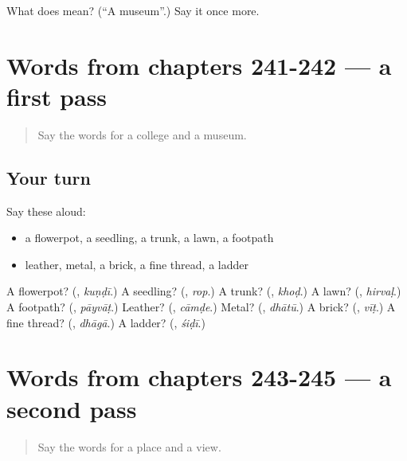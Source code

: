 \begin{tcolorbox}[breakable,colback=teal!4,colframe=teal!35!black,title={Before you move on}]
What does  mean? (\textquotedblleft{}A museum\textquotedblright{}.) Say it once more.
\end{tcolorbox}
\section[(dialogue)]{Words from chapters 241-242 — a first pass}

\label{lesson:MR-R245-first-pass-words-from-chapters-241-242}



\begin{quote}
Say the words for a college and a museum.
\end{quote}

\subsection*{Your turn}
Say these aloud:

\begin{itemize}
\raggedright
  \item a flowerpot, a seedling, a trunk, a lawn, a footpath
  \item leather, metal, a brick, a fine thread, a ladder
\end{itemize}

\begin{tcolorbox}[breakable,colback=teal!4,colframe=teal!35!black,title={Before you move on}]
A flowerpot? (\textbf{}, \emph{kuṇḍī}.) A seedling? (\textbf{}, \emph{rop}.) A trunk? (\textbf{}, \emph{khoḍ}.) A lawn? (\textbf{}, \emph{hirvaḷ}.) A footpath? (\textbf{}, \emph{pāyvāṭ}.) Leather? (\textbf{}, \emph{cāmḍe}.) Metal? (\textbf{}, \emph{dhātū}.) A brick? (\textbf{}, \emph{vīṭ}.) A fine thread? (\textbf{}, \emph{dhāgā}.) A ladder? (\textbf{}, \emph{śiḍī}.)
\end{tcolorbox}
\section[(dialogue)]{Words from chapters 243-245 — a second pass}

\label{lesson:MR-R245-second-pass-words-from-chapters-243-245}



\begin{quote}
Say the words for a place and a view.
\end{quote}

